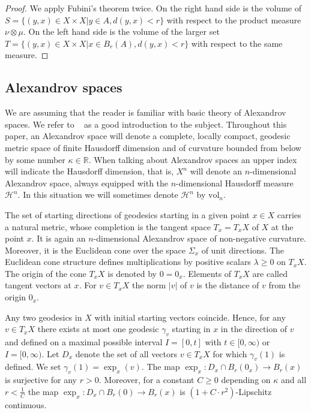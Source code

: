 \documentclass[12pt,leqno]{amsart}
\numberwithin{equation}{section}
\theoremstyle{definition}
\theoremstyle{remark}
\newcommand{\vol}{\mathrm{vol}}
\newcommand{\R}{\mathbb{R}}
\def\:{\colon}
\begin{document}
\begin{proof} We apply Fubini's theorem twice.
On the right hand side is the volume of  $S=\{(y,x) \in X\times X| y \in A, d(y,x) <r \}$ with respect to the product measure $\nu \otimes \mu$.
On the left hand side is the volume of the larger set $T=\{(y,x) \in  X\times X| x\in B_r(A), d(y,x)<r \}$ with respect to the same measure.
\end{proof}

\subsection{Alexandrov spaces} \label{subsec:Alex}
We are assuming that the reader is familiar with basic theory of Alexandrov spaces. We refer to ~\cite{BGP} as a good introduction to the subject.
Throughout this paper, an Alexandrov space will denote a complete, locally compact, geodesic metric space of finite Hausdorff dimension and of curvature bounded from below by some
number $\kappa \in \R$.
When talking about Alexandrov spaces an upper index will indicate the Hausdorff dimension, that is, $X^n$ will denote an $n$-dimensional Alexandrov space, always equipped with the $n$-dimensional Hausdorff measure $\mathcal H^n$. In this situation we will sometimes denote
 $\mathcal H^n$ by $\vol_n$.

The set of starting directions of geodesics starting in a given point $x\in X$ carries a natural metric, whose completion is the tangent space $T_x=T_xX$
of $X$ at the point $x$.  It is again an $n$-dimensional Alexandrov space of non-negative curvature. Moreover, it is the Euclidean cone
over the space $\Sigma _x$ of unit directions. The Euclidean cone structure defines multiplications by positive scalars $\lambda \geq 0$ on $T_xX$. The origin
of the cone $T_xX$ is denoted by $0=0_x$. Elements of $T_xX$ are called tangent vectors at $x$. For $v\in T_xX$ the norm $|v|$ of $v$ is the distance of $v$ from the origin $0_x$.




Any two geodesics in $X$ with initial starting vectors coincide. Hence,
for any $v\in T_xX$ there exists at most one geodesic $\gamma _v$  starting in $x$ in the direction of $v$ and defined on a maximal possible interval $I =[0,t]$ with $t\in [0, \infty )$
or $I=[0,\infty)$.  Let $D_x$ denote the set of all vectors $v\in T_xX$ for which $\gamma _v(1)$ is defined.
We set $\gamma _v (1)=\exp_x (v)$. The map $\exp_x \:D_x \cap B_r(0_x) \to B_r(x)$ is surjective for any $r>0$.
 Moreover, for a constant $C\geq 0$ depending on $\kappa$ and all $r< \frac 1 C$ the map $\exp_x \:D_x \cap B_r(0) \to B_r(x)$ is  $(1+ C \cdot  r^2)$-Lipschitz continuous.
\end{document}
